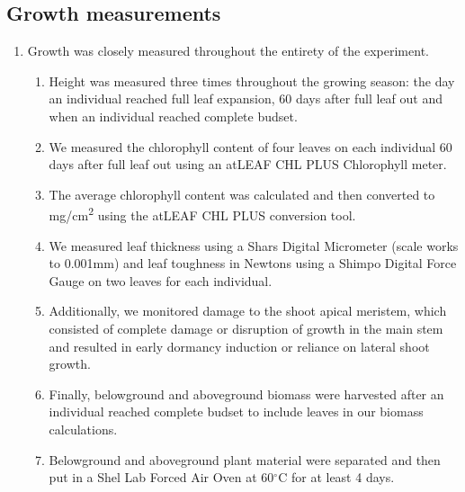 \documentclass{article}\usepackage[]{graphicx}\usepackage[]{color}
\begin{document}
\subsection*{Growth measurements}
\begin{enumerate}
\item Growth was closely measured throughout the entirety of the experiment. 
  \begin{enumerate}
  \item Height was measured three times throughout the growing season: the day an individual reached full leaf expansion, 60 days after full leaf out and when an individual reached complete budset. 
  \item We measured the chlorophyll content of four leaves on each individual 60 days after full leaf out using an atLEAF CHL PLUS Chlorophyll meter.
  \item The average chlorophyll content was calculated and then converted to mg/cm\textsuperscript{2} using the atLEAF CHL PLUS conversion tool.
  \item We measured leaf thickness using a Shars Digital Micrometer (scale works to 0.001mm) and leaf toughness in Newtons using a Shimpo Digital Force Gauge on two leaves for each individual.
  \item Additionally, we monitored damage to the shoot apical meristem, which consisted of complete damage or disruption of growth in the main stem and resulted in early dormancy induction or reliance on lateral shoot growth.
  \item Finally, belowground and aboveground biomass were harvested after an individual reached complete budset to include leaves in our biomass calculations. 
  \item Belowground and aboveground plant material were separated and then put in a Shel Lab Forced Air Oven at 60$^{\circ}$C for at least 4 days. 
  \end{enumerate}
\end{enumerate}
\end{document}
